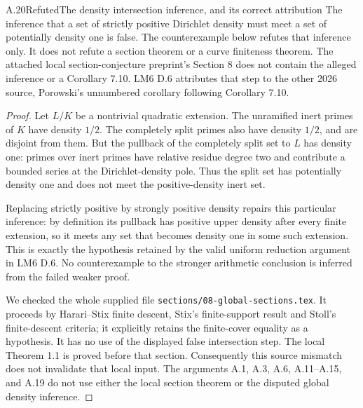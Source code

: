 \begin{statement}{A.20}{Refuted}{The density intersection inference, and its correct attribution}
The inference that a set of strictly positive Dirichlet density
must meet a set of potentially density one is false. The
counterexample below refutes that inference only. It does not
refute a section theorem or a curve finiteness theorem.
The attached local section-conjecture preprint's Section 8
does not contain the alleged inference or a Corollary 7.10.
LM6 D.6 attributes that step to the other 2026 source, Porowski's
unnumbered corollary following Corollary 7.10.
\end{statement}
\begin{proof}
Let $L/K$ be a nontrivial quadratic extension. The unramified
inert primes of $K$ have density $1/2$. The completely split
primes also have density $1/2$, and are disjoint from them.
But the pullback of the completely split set to $L$ has density
one: primes over inert primes have relative residue degree two
and contribute a bounded series at the Dirichlet-density pole.
Thus the split set has potentially density one and does not meet
the positive-density inert set.

Replacing strictly positive by strongly positive density repairs
this particular inference: by definition its pullback has
positive upper density after every finite extension, so it
meets any set that becomes density one in some such extension.
This is exactly the hypothesis retained by the valid uniform
reduction argument in LM6 D.6. No counterexample to the stronger
arithmetic conclusion is inferred from the failed weaker proof.

We checked the whole supplied file
\texttt{sections/08-global-sections.tex}. It proceeds by
Harari--Stix finite descent, Stix's finite-support result and
Stoll's finite-descent criteria; it explicitly retains the
finite-cover equality as a hypothesis. It has no use of the
displayed false intersection step. The local Theorem 1.1 is
proved before that section. Consequently this source mismatch
does not invalidate that local input. The arguments A.1, A.3,
A.6, A.11--A.15, and A.19 do not use either the local section
theorem or the disputed global density inference.
\end{proof}
